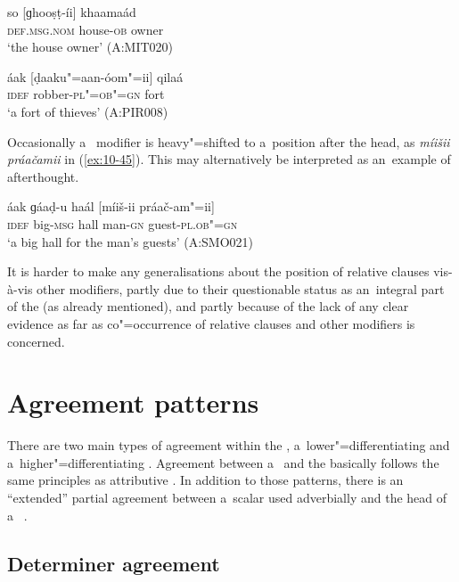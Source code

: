 \begin{exe}
\ex
\label{ex:10-43}
\gll so [ɡhooṣṭ-íi] khaamaád \\
\textsc{def.msg.nom} house-\textsc{ob} owner  \\
\glt `the house owner' (A:MIT020)

\ex
\label{ex:10-44}
\gll áak [ḍaaku"=aan-óom"=ii] qilaá  \\
\textsc{idef} robber-\textsc{pl"=ob"=gn} fort  \\
\glt `a fort of thieves' (A:PIR008)
\end{exe}


Occasionally a~ modifier is heavy"=shifted to a~position after the  head, as \textit{míišii práačamii} in (\ref{ex:10-45}). This may alternatively be interpreted as an~example of afterthought.

\begin{exe}
\ex
\label{ex:10-45}
\gll áak ɡáaḍ-u haál [míiš-ii práač-am"=ii] \\
\textsc{idef} big-\textsc{msg} hall man-\textsc{gn} guest-\textsc{pl.ob"=gn}  \\
\glt `a big hall for the man's guests' (A:SMO021)
\end{exe}


It is harder to make any generalisations about the position of relative clauses vis-à-vis other modifiers, partly due to their questionable status as an~integral part of the   (as already mentioned), and partly because of the lack of any clear evidence as far as co"=occurrence of relative clauses and other modifiers is concerned.


\section{Agreement patterns}
\label{sec:10-3}

There are two main types of agreement within the  , a~lower"=differentiating  and a~higher"=differentiating . Agreement between a~   and the    basically follows the same principles as attributive . In addition to those patterns, there is an ``extended'' partial agreement between a~scalar  used adverbially and the head of a~ .


\subsection{Determiner agreement}
\label{subsec:10-3-1}


